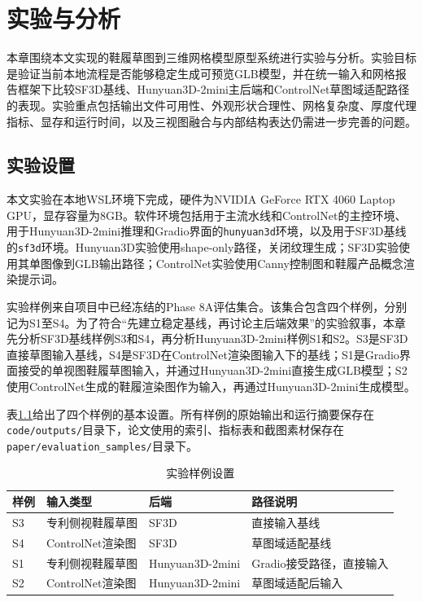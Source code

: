 
\chapter{实验与分析}

本章围绕本文实现的鞋履草图到三维网格模型原型系统进行实验与分析。实验目标是验证当前本地流程是否能够稳定生成可预览GLB模型，并在统一输入和网格报告框架下比较SF3D基线、Hunyuan3D-2mini主后端和ControlNet草图域适配路径的表现。实验重点包括输出文件可用性、外观形状合理性、网格复杂度、厚度代理指标、显存和运行时间，以及三视图融合与内部结构表达仍需进一步完善的问题。

\section{实验设置}

本文实验在本地WSL环境下完成，硬件为NVIDIA GeForce RTX 4060 Laptop GPU，显存容量为8GB。软件环境包括用于主流水线和ControlNet的主控环境、用于Hunyuan3D-2mini推理和Gradio界面的\texttt{hunyuan3d}环境，以及用于SF3D基线的\texttt{sf3d}环境。Hunyuan3D实验使用shape-only路径，关闭纹理生成；SF3D实验使用其单图像到GLB输出路径；ControlNet实验使用Canny控制图和鞋履产品概念渲染提示词。

实验样例来自项目中已经冻结的Phase 8A评估集合。该集合包含四个样例，分别记为S1至S4。为了符合“先建立稳定基线，再讨论主后端效果”的实验叙事，本章先分析SF3D基线样例S3和S4，再分析Hunyuan3D-2mini样例S1和S2。S3是SF3D直接草图输入基线，S4是SF3D在ControlNet渲染图输入下的基线；S1是Gradio界面接受的单视图鞋履草图输入，并通过Hunyuan3D-2mini直接生成GLB模型；S2使用ControlNet生成的鞋履渲染图作为输入，再通过Hunyuan3D-2mini生成模型。

表\ref{tab:eval-samples}给出了四个样例的基本设置。所有样例的原始输出和运行摘要保存在\texttt{code/outputs/}目录下，论文使用的索引、指标表和截图素材保存在\texttt{paper/evaluation\_samples/}目录下。

\begin{table}[htbp]
  \centering
  \caption{实验样例设置}
  \label{tab:eval-samples}
  \setlength{\tabcolsep}{3pt}
  \begin{tabular}{@{}p{}p{}p{}p{}@{}}
    \toprule
    样例 & 输入类型 & 后端 & 路径说明 \\
    \midrule
    S3 & 专利侧视鞋履草图 & SF3D & 直接输入基线 \\
    S4 & ControlNet渲染图 & SF3D & 草图域适配基线 \\
    S1 & 专利侧视鞋履草图 & Hunyuan3D-2mini & Gradio接受路径，直接输入 \\
    S2 & ControlNet渲染图 & Hunyuan3D-2mini & 草图域适配后输入 \\
    \bottomrule
  \end{tabular}
\end{table}

